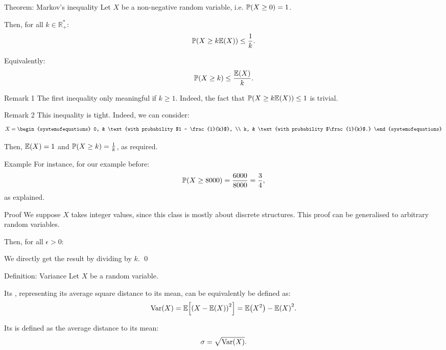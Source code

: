 \documentclass[a4paper]{article}
\begin{document}
\begin{parag}{Theorem: Markov's inequality}
    Let $X$ be a non-negative random variable, i.e. $\prob\left(X \geq 0\right) = 1$.

    Then, for all $k \in \mathbb{R}^*_+$: 
    \[\prob\left(X \geq k \exval\left(X\right)\right) \leq \frac{1}{k}.\]

    Equivalently: 
    \[\prob\left(X \geq k\right) \leq \frac{\exval\left(X\right)}{k}.\]
    
    \begin{subparag}{Remark 1}
        The first inequality only meaningful if $k \geq 1$. Indeed, the fact that $\prob\left(X \geq k \exval\left(X\right)\right) \leq 1$ is trivial.
    \end{subparag}

    \begin{subparag}{Remark 2}
        This inequality is tight. Indeed, we can consider:
        \[X = \begin{systemofequations} 0, & \text{with probability $1 - \frac{1}{k}$}, \\ k, & \text{with probability $\frac{1}{k}$.} \end{systemofequations}\]

        Then, $\exval\left(X\right) = 1$ and $\prob\left(X \geq k\right) = \frac{1}{k}$, as required.
    \end{subparag}

    \begin{subparag}{Example}
        For instance, for our example before: 
        \[\prob\left(X \geq 8000\right) = \frac{6000}{8000} = \frac{3}{4},\]
        as explained.
    \end{subparag}

    \begin{subparag}{Proof}
        We suppose $X$ takes integer values, since this class is mostly about discrete structures. This proof can be generalised to arbitrary random variables.

        Then, for all $\epsilon > 0$: 

        We directly get the result by dividing by $k$.
        \qed
    \end{subparag}
\end{parag}

\begin{parag}{Definition: Variance}
    Let $X$ be a random variable.

    Its , representing its average square distance to its mean, can be equivalently be defined as: 
    \[\Var\left(X\right) = \exval\left[\left(X - \exval\left(X\right)\right)^2\right] = \exval\left(X^2\right) - \exval\left(X\right)^2.\]

    Its  is defined as the average distance to its mean: 
    \[\sigma = \sqrt{\Var\left(X\right)}.\]
    
\end{parag}
\end{document}
